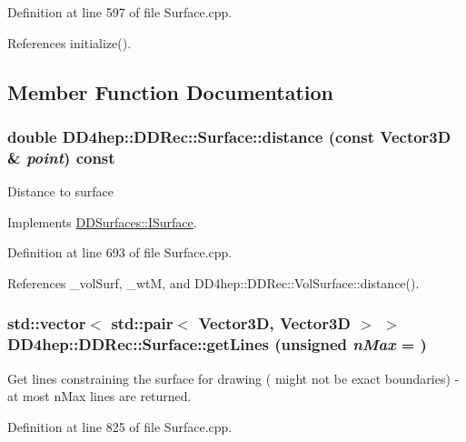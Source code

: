 Definition at line 597 of file Surface.cpp.

References initialize().

\subsection{Member Function Documentation}
\hypertarget{class_d_d4hep_1_1_d_d_rec_1_1_surface_a6c791cb45a57af72d629fc44ea208df4}{
\subsubsection[{distance}]{\setlength{\rightskip}{0pt plus 5cm}double DD4hep::DDRec::Surface::distance (const {\bf Vector3D} \& {\em point}) const}}
\label{class_d_d4hep_1_1_d_d_rec_1_1_surface_a6c791cb45a57af72d629fc44ea208df4}
Distance to surface 

Implements \hyperlink{class_d_d_surfaces_1_1_i_surface_a430ebd157354388b50218dfb356a9ca1}{DDSurfaces::ISurface}.

Definition at line 693 of file Surface.cpp.

References \_\-volSurf, \_\-wtM, and DD4hep::DDRec::VolSurface::distance().\hypertarget{class_d_d4hep_1_1_d_d_rec_1_1_surface_a54c81a4857e760fd9abb6773a9c19301}{
\subsubsection[{getLines}]{\setlength{\rightskip}{0pt plus 5cm}std::vector$<$ std::pair$<$ {\bf Vector3D}, {\bf Vector3D} $>$ $>$ DD4hep::DDRec::Surface::getLines (unsigned {\em nMax} = {})}}
\label{class_d_d4hep_1_1_d_d_rec_1_1_surface_a54c81a4857e760fd9abb6773a9c19301}
Get lines constraining the surface for drawing ( might not be exact boundaries) -\/ at most nMax lines are returned. 

Definition at line 825 of file Surface.cpp.

